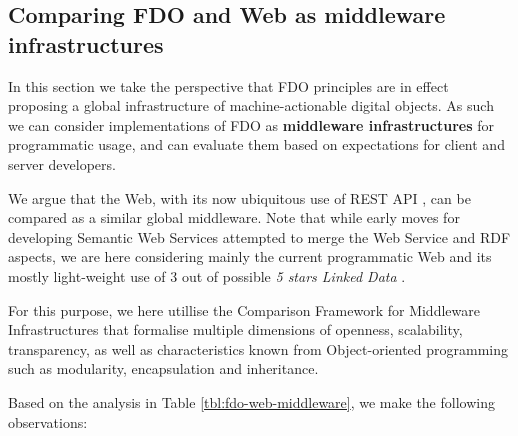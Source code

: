 \documentclass[fleqn,10pt,NOlineno]{wlpeerjlua}
\begin{document}


\subsection*{Comparing FDO and Web as middleware infrastructures}\label{sec:middleware}

In this section we take the perspective that FDO principles are in effect proposing a global infrastructure of machine-actionable digital objects. As such we can consider implementations of FDO as \textbf{middleware infrastructures} for programmatic usage, and can evaluate them based on expectations for client and server developers.

We argue that the Web, with its now ubiquitous use of REST API \autocite{fieldingArchitecturalStylesDesign2000a}, can be compared as a similar global middleware. Note that while early moves for developing Semantic Web Services \autocite{fenselSemanticWebServices2011} attempted to merge the Web Service and RDF aspects, we are here considering mainly the current programmatic Web and its mostly light-weight use of 3 out of possible \emph{5 stars Linked Data} \autocite{OpenData}.

For this purpose, we here utillise the Comparison Framework for Middleware Infrastructures \autocite{zarrasComparisonFrameworkMiddleware2004a} that formalise multiple dimensions of openness, scalability, transparency, as well as characteristics known from Object-oriented programming such as modularity, encapsulation and inheritance.

Based on the analysis in Table \vref{tbl:fdo-web-middleware}, we make the following observations:
\end{document}
